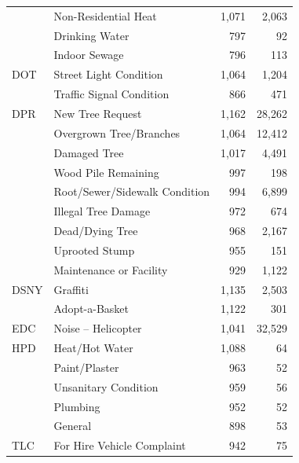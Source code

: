 \documentclass[11pt]{article}
\begin{document}
\begin{table}[t]
\begin{tabular}{llrr}
      & Non-Residential Heat                   & 1{,}071 &  2{,}063 \\
      & Drinking Water                         &     797 &       92 \\
      & Indoor Sewage                          &     796 &      113 \\
\midrule
DOT   & Street Light Condition                 & 1{,}064 &  1{,}204 \\
      & Traffic Signal Condition               &     866 &      471 \\
\midrule
DPR   & New Tree Request                       & 1{,}162 & 28{,}262 \\
      & Overgrown Tree/Branches                & 1{,}064 & 12{,}412 \\
      & Damaged Tree                           & 1{,}017 &  4{,}491 \\
      & Wood Pile Remaining                    &     997 &      198 \\
      & Root/Sewer/Sidewalk Condition          &     994 &  6{,}899 \\
      & Illegal Tree Damage                    &     972 &      674 \\
      & Dead/Dying Tree                        &     968 &  2{,}167 \\
      & Uprooted Stump                         &     955 &      151 \\
      & Maintenance or Facility                &     929 &  1{,}122 \\
\midrule
DSNY  & Graffiti                               & 1{,}135 &  2{,}503 \\
      & Adopt-a-Basket                         & 1{,}122 &      301 \\
\midrule
EDC   & Noise -- Helicopter                    & 1{,}041 & 32{,}529 \\
\midrule
HPD   & Heat/Hot Water                         & 1{,}088 &       64 \\
      & Paint/Plaster                          &     963 &       52 \\
      & Unsanitary Condition                   &     959 &       56 \\
      & Plumbing                               &     952 &       52 \\
      & General                                &     898 &       53 \\
\midrule
TLC   & For Hire Vehicle Complaint             &     942 &       75 \\
\bottomrule
\end{tabular}
\end{table}

\clearpage


\end{document}
